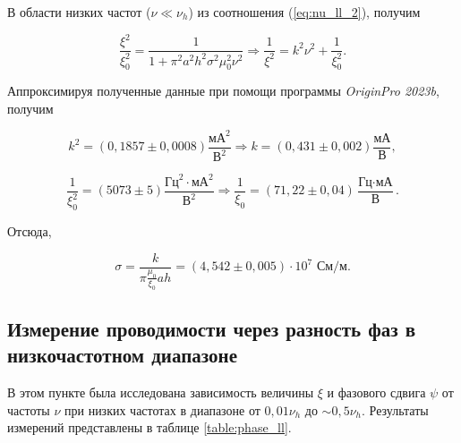 \documentclass[a4paper, 12pt]{article}
\begin{document}
    В области низких частот ($\nu \ll \nu_h$) из соотношения (\ref{eq:nu_ll_2}), получим

    \begin{equation*}
        \frac{\xi^2}{\xi_0^2} = \frac{1}{1 + \pi^2 a^2 h^2 \sigma^2 \mu_0^2 \nu^2} \Rightarrow \frac{1}{\xi^2} = k^2 \nu^2 + \frac{1}{\xi_0^2}.
    \end{equation*}

     Аппроксимируя полученные данные при помощи программы \textit{OriginPro 2023b}, получим

     \begin{equation*}
         k^2 = \left( 0,1857 \pm 0,0008 \right) \frac{\text{мА}^2}{\text{В}^2} \Rightarrow k = \left( 0,431 \pm 0,002 \right) \frac{\text{мА}}{\text{В}},
     \end{equation*}

     \begin{equation*}
         \frac{1}{\xi_0^2} = \left( 5073 \pm 5 \right) \frac{\text{Гц}^2 \cdot \text{мА}^2}{\text{В}^2} \Rightarrow \frac{1}{\xi_0} = \left( 71,22 \pm 0,04 \right) \frac{\text{Гц} \cdot \text{мА}}{\text{В}}.
     \end{equation*}

     Отсюда,

     \begin{equation*}
         \boxed{\sigma = \frac{k}{\pi \frac{\mu_0 }{\xi_0}ah} = \left( 4,542 \pm 0,005 \right) \cdot 10^7 \text{ См/м}}.
     \end{equation*}

     \subsection{Измерение проводимости через разность фаз в низкочастотном диапазоне}

     В этом пункте была исследована зависимость величины $\xi$ и фазового сдвига $\psi$ от частоты $\nu$ при низких частотах в диапазоне от $0,01 \nu_h$ до $\sim 0,5 \nu_h$. Результаты измерений представлены в таблице \ref{table:phase_ll}.
\end{document}
